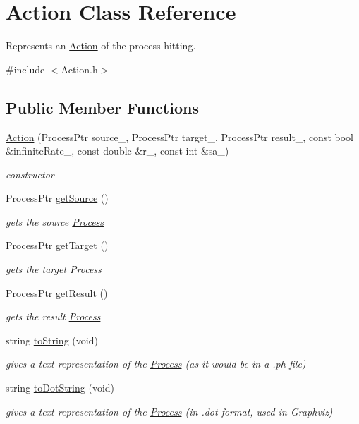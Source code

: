 \hypertarget{classAction}{\section{Action Class Reference}
\label{classAction}
}


Represents an \hyperlink{classAction}{Action} of the process hitting.  




{\ttfamily \#include $<$Action.\+h$>$}

\subsection*{Public Member Functions}
\begin{DoxyCompactItemize}
\item 
\hyperlink{classAction_a813d7e506bed06d58988b8efa46371c7}{Action} (Process\+Ptr source\+\_\+, Process\+Ptr target\+\_\+, Process\+Ptr result\+\_\+, const bool \&infinite\+Rate\+\_\+, const double \&r\+\_\+, const int \&sa\+\_\+)
\begin{DoxyCompactList}\small\item\em constructor \end{DoxyCompactList}\item 
Process\+Ptr \hyperlink{classAction_a19ce83cb05f0823e2426549108b29c55}{get\+Source} ()
\begin{DoxyCompactList}\small\item\em gets the source \hyperlink{classProcess}{Process} \end{DoxyCompactList}\item 
Process\+Ptr \hyperlink{classAction_a1a6bbe7a883a55d0c446ec5e23ae36d6}{get\+Target} ()
\begin{DoxyCompactList}\small\item\em gets the target \hyperlink{classProcess}{Process} \end{DoxyCompactList}\item 
Process\+Ptr \hyperlink{classAction_ad2f1969b3f50dd235000c6788a978ba0}{get\+Result} ()
\begin{DoxyCompactList}\small\item\em gets the result \hyperlink{classProcess}{Process} \end{DoxyCompactList}\item 
string \hyperlink{classAction_a0dfc2e29fbaca7c75d60fd3cd8582052}{to\+String} (void)
\begin{DoxyCompactList}\small\item\em gives a text representation of the \hyperlink{classProcess}{Process} (as it would be in a .ph file) \end{DoxyCompactList}\item 
string \hyperlink{classAction_aa38afb2bcdc765b8e905a8c0af68b7a8}{to\+Dot\+String} (void)
\begin{DoxyCompactList}\small\item\em gives a text representation of the \hyperlink{classProcess}{Process} (in .dot format, used in Graphviz) \end{DoxyCompactList}\end{DoxyCompactItemize}
